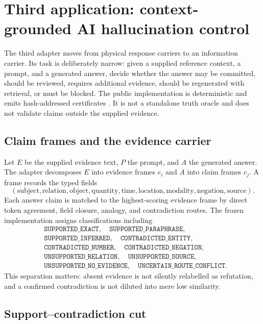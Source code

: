 \section{Third application: context-grounded AI hallucination control}

The third adapter moves from physical response carriers to an information carrier. Its task is deliberately narrow: given a supplied reference context, a prompt, and a generated answer, decide whether the answer may be committed, should be reviewed, requires additional evidence, should be regenerated with retrieval, or must be blocked. The public implementation is deterministic and emits hash-addressed certificates \cite{aiTrustRelease}. It is not a standalone truth oracle and does not validate claims outside the supplied evidence.

\subsection{Claim frames and the evidence carrier}

Let $E$ be the supplied evidence text, $P$ the prompt, and $A$ the generated answer. The adapter decomposes $E$ into evidence frames $e_i$ and $A$ into claim frames $c_j$. A frame records the typed fields
\[
(\text{subject},\text{relation},\text{object},\text{quantity},\text{time},
\text{location},\text{modality},\text{negation},\text{source}).
\]
Each answer claim is matched to the highest-scoring evidence frame by direct token agreement, field closure, analogy, and contradiction routes. The frozen implementation assigns classifications including
\[
\begin{aligned}
&\texttt{SUPPORTED\_EXACT},\quad \texttt{SUPPORTED\_PARAPHRASE},\\
&\texttt{SUPPORTED\_INFERRED},\quad \texttt{CONTRADICTED\_ENTITY},\\
&\texttt{CONTRADICTED\_NUMBER},\quad \texttt{CONTRADICTED\_NEGATION},\\
&\texttt{UNSUPPORTED\_RELATION},\quad \texttt{UNSUPPORTED\_SOURCE},\\
&\texttt{UNSUPPORTED\_NO\_EVIDENCE},\quad \texttt{UNCERTAIN\_ROUTE\_CONFLICT}.
\end{aligned}
\]
This separation matters: absent evidence is not silently relabelled as refutation, and a confirmed contradiction is not diluted into mere low similarity.

\subsection{Support--contradiction cut}

